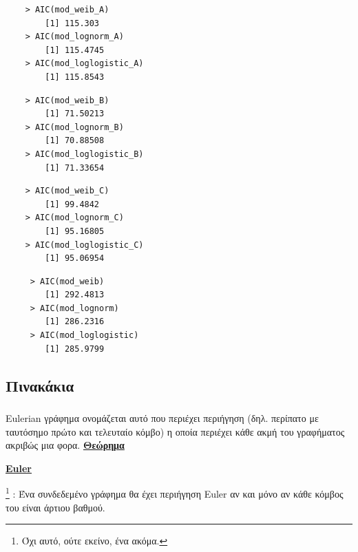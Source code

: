 \documentclass[12pt]{article}
\begin{document}
\noindent\begin{minipage}{.45\textwidth}
\begin{lstlisting}
    > AIC(mod_weib_A)
	    [1] 115.303
    > AIC(mod_lognorm_A)
	    [1] 115.4745
    > AIC(mod_loglogistic_A)
	    [1] 115.8543
\end{lstlisting}
\end{minipage}\hfill
\noindent\begin{minipage}{.45\textwidth}
\begin{lstlisting}
    > AIC(mod_weib_B)
	    [1] 71.50213
    > AIC(mod_lognorm_B)
	    [1] 70.88508
    > AIC(mod_loglogistic_B)
	    [1] 71.33654
\end{lstlisting}
\end{minipage}
\noindent\begin{minipage}{.45\textwidth}
\begin{lstlisting}
    > AIC(mod_weib_C)
	    [1] 99.4842
    > AIC(mod_lognorm_C)
	    [1] 95.16805
    > AIC(mod_loglogistic_C)
	    [1] 95.06954
\end{lstlisting}
\end{minipage}\hfill
\noindent\begin{minipage}{.45\textwidth}
\begin{lstlisting}
     > AIC(mod_weib)
     	[1] 292.4813
     > AIC(mod_lognorm)
        [1] 286.2316
     > AIC(mod_loglogistic)
    	[1] 285.9799
\end{lstlisting}
\end{minipage}

\subsection{Πινακάκια}
\subsubsection{}
\begin{tcolorbox}[title=\textlatin{Eulerian} Γράφημα]
\textlatin{Eulerian} γράφημα ονομάζεται αυτό που περιέχει περιήγηση (δηλ. περίπατο με ταυτόσημο πρώτο και τελευταίο κόμβο) η οποία περιέχει κάθε ακμή του γραφήματος ακριβώς μια φορα.
\tcblower
\ul{\textbf{Θεώρημα }}{\begin{otherlanguage}{english}\ul{\textbf{Euler}}\end{otherlanguage}  } \footnote{Όχι αυτό, ούτε εκείνο, ένα ακόμα. } : Ένα συνδεδεμένο γράφημα θα έχει περιήγηση \textlatin{Euler} αν και μόνο αν κάθε κόμβος του είναι άρτιου βαθμού.
\end{tcolorbox}
\end{document}
